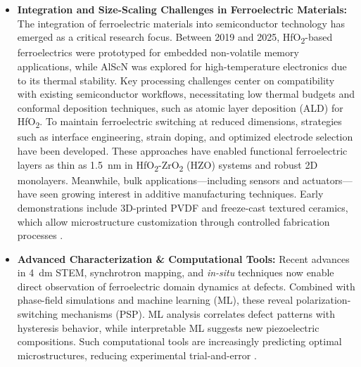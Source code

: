\documentclass[a4paper,fleqn]{cas-sc}
\begin{document}
\begin{itemize}
    \item \textbf{Integration and Size-Scaling Challenges in Ferroelectric Materials:} The integration of ferroelectric materials into semiconductor technology has emerged as a critical research focus. Between 2019 and 2025, HfO\textsubscript{2}-based ferroelectrics were prototyped for embedded non-volatile memory applications, while AlScN was explored for high-temperature electronics due to its thermal stability. Key processing challenges center on compatibility with existing semiconductor workflows, necessitating low thermal budgets and conformal deposition techniques, such as atomic layer deposition (ALD) for HfO\textsubscript{2}. To maintain ferroelectric switching at reduced dimensions, strategies such as interface engineering, strain doping, and optimized electrode selection have been developed. These approaches have enabled functional ferroelectric layers as thin as 1.5\, nm in HfO\textsubscript{2}-ZrO\textsubscript{2} (HZO) systems and robust 2D monolayers. Meanwhile, bulk applications—including sensors and actuators—have seen growing interest in additive manufacturing techniques. Early demonstrations include 3D-printed PVDF and freeze-cast textured ceramics, which allow microstructure customization through controlled fabrication processes \cite{zhang2024new,shi2023interface,cho2024atomic}.
    
    \item \textbf{Advanced Characterization \& Computational Tools:} Recent advances in \SI{4}{\deci\meter} STEM, synchrotron mapping, and \textit{in-situ} techniques now enable direct observation of ferroelectric domain dynamics at defects. Combined with phase-field simulations and machine learning (ML), these reveal polarization-switching mechanisms (PSP). ML analysis correlates  defect patterns with hysteresis behavior, while interpretable ML suggests new piezoelectric compositions. Such computational tools are increasingly predicting optimal microstructures, reducing experimental trial-and-error \cite{zhu2025ultrahigh,alhada2025elucidating,tan2015unfolding,zhang2024new}.
    

\end{itemize}
\end{document}
